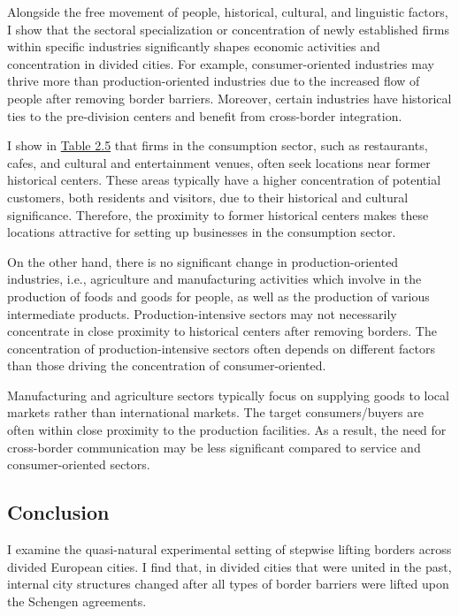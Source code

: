 \documentclass[12pt]{article}    %
\begin{document}
\par Alongside the free movement of people, historical, cultural, and linguistic factors, I show that the sectoral specialization or concentration of newly established firms within specific industries significantly shapes economic activities and concentration in divided cities. For example, consumer-oriented industries may thrive more than production-oriented industries due to the increased flow of people after removing border barriers. Moreover, certain industries have historical ties to the pre-division centers and benefit from cross-border integration.  



\par I show in \hyperlink{Table 2.5}{Table 2.5} that firms in the consumption sector, such as restaurants, cafes, and cultural and entertainment venues, often seek locations near former historical centers. These areas typically have a higher concentration of potential customers, both residents and visitors, due to their historical and cultural significance. Therefore, the proximity to former historical centers makes these locations attractive for setting up businesses in the consumption sector.

\par On the other hand, there is no significant change in production-oriented industries, i.e., agriculture and manufacturing activities which involve in the production of foods and goods for people, as well as the production of various intermediate products. Production-intensive sectors may not necessarily concentrate in close proximity to historical centers after removing borders. The concentration of production-intensive sectors often depends on different factors than those driving the concentration of consumer-oriented.

\par Manufacturing and agriculture sectors typically focus on supplying goods to local markets rather than international markets. The target  consumers/buyers are often within close proximity to the production facilities. As a result, the need for cross-border communication may be less significant compared to service and consumer-oriented sectors.

\subsection{Conclusion}

\par I examine the quasi-natural experimental setting of stepwise lifting borders across divided European cities.  I find that, in divided cities that were united in the past, internal city structures changed after all types of border barriers were lifted upon the Schengen agreements.
\end{document}
